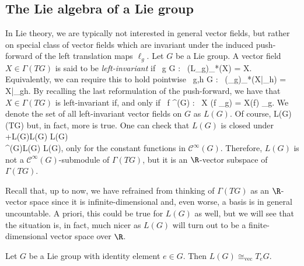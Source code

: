 \subsection{The Lie algebra of a Lie group}

In Lie theory, we are typically not interested in general vector fields, but rather on special class of vector fields which are invariant under the induced push-forward of the left translation maps $\ell_g$.
\bd
Let $G$ be a Lie group. A vector field $X\in\Gamma(TG)$ is said to be \emph{left-invariant} if
\bse
\forall \, g \in G  : \ (L_g)_*(X) = X.
\ese
Equivalently, we can require this to hold pointwise
\bse
\forall \, g,h \in G : \ (\ell_g)_*(X|_h) = X|_{gh}.
\ese
\ed
By recalling the last reformulation of the push-forward, we have that $X\in\Gamma(TG)$ is left-invariant if, and only if
\bse
\forall \, f \in {}^\infty(G) : \ X (f \circ \ell_g) = X(f) \circ \ell_g.
\ese
We denote the set of all left-invariant vector fields on $G$ as $L(G)$. Of course,
\bse
L(G)\se\Gamma(TG)
\ese
but, in fact, more is true. One can check that $L(G)$ is closed under 
+\cl L(G)\times L(G) \to L(G)\\
\cdot  \cl {}^\infty(G)\times L(G) \to L(G),
\ei
only for the constant functions in $\mathcal{C}^\infty(G)$. Therefore, $L(G)$ is not a $\mathcal{C}^\infty(G)$-submodule of $\Gamma(TG)$, but it is an $\R$-vector subspace of $\Gamma(TG)$.

Recall that, up to now, we have refrained from thinking of $\Gamma(TG)$ as an $\R$-vector space since it is infinite-dimensional and, even worse, a basis is in general uncountable. A priori, this could be true for $L(G)$ as well, but we will see that the situation is, in fact, much nicer as $L(G)$ will turn out to be a finite-dimensional vector space over $\R$. 

\begin{theorem}
Let $G$ be a Lie group with identity element $e\in G$. Then $L(G)\cong_\mathrm{vec} T_eG$.
\end{theorem}

